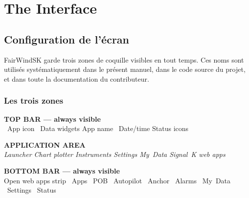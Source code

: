 \part{The Interface}

\chapter{Configuration de l'écran}

FairWindSK garde trois zones de coquille visibles en tout temps.
Ces noms sont utilisés systématiquement dans le présent manuel, dans le code source du projet,
et dans toute la documentation du contributeur.

\section{Les trois zones}

\begin{center}
\begin{tcolorbox}[enhanced,colback=LtBlue,colframe=Navy,boxrule=1.5pt,arc=4pt,
  top=7pt,bottom=5pt,left=12pt,right=12pt,width=0.96\textwidth]
  {\sffamily\bfseries\color{Navy}TOP BAR --- always visible}\\[3pt]
  {\small{}~App icon \quad
         ~Data widgets \quad
         App name \quad
         ~Date/time \quad
         Status icons}
\end{tcolorbox}
\vspace{2pt}
\begin{tcolorbox}[enhanced,colback=white,colframe=Navy,boxrule=1.5pt,arc=4pt,
  top=26pt,bottom=26pt,left=12pt,right=12pt,width=0.96\textwidth]
  \centering
  {\large\sffamily\bfseries\color{MidGray}APPLICATION AREA}\\[4pt]
  {\small\sffamily\color{MidGray}\itshape
    Launcher \textbar{} Chart plotter \textbar{} Instruments \textbar{}
    Settings \textbar{} My~Data \textbar{} Signal~K web apps}
\end{tcolorbox}
\vspace{2pt}
\begin{tcolorbox}[enhanced,colback=LtBlue,colframe=Navy,boxrule=1.5pt,arc=4pt,
  top=7pt,bottom=5pt,left=12pt,right=12pt,width=0.96\textwidth]
  {\sffamily\bfseries\color{Navy}BOTTOM BAR --- always visible}\\[3pt]
  {\small
    Open web apps strip \quad
    ~Apps \quad
    ~POB \quad
    ~Autopilot \quad
    ~Anchor \quad
    ~Alarms \quad
    ~My~Data \quad
    ~Settings \quad
    ~Status}
\end{tcolorbox}
\end{center}

